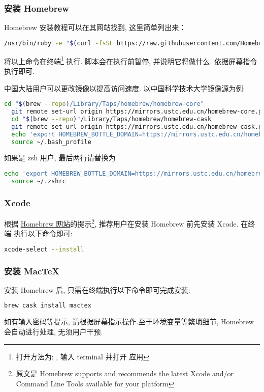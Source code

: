 \subsubsection{安装 Homebrew}
Homebrew 安装教程可以在其网站找到, 这里简单列出来：

\begin{lstlisting}[language=bash]
  /usr/bin/ruby -e "$(curl -fsSL https://raw.githubusercontent.com/Homebrew/install/master/install)"
\end{lstlisting}
将以上命令在\textsf{终端}\footnote{%
  打开方法为: \keys{\cmdmac + \SPACE}, 输入 \textsf{terminal} 并打开  应用}%
执行.
脚本会在执行前暂停, 并说明它将做什么. 依据屏幕指令执行即可.

中国大陆用户可以更改镜像以提高访问速度. 以中国科学技术大学镜像源为例:
\begin{lstlisting}[language=bash]
  cd "$(brew --repo)/Library/Taps/homebrew/homebrew-core"
  git remote set-url origin https://mirrors.ustc.edu.cn/homebrew-core.git
  cd "$(brew --repo)"/Library/Taps/homebrew/homebrew-cask
  git remote set-url origin https://mirrors.ustc.edu.cn/homebrew-cask.git
  echo 'export HOMEBREW_BOTTLE_DOMAIN=https://mirrors.ustc.edu.cn/homebrew-bottles' >> ~/.bash_profile
  source ~/.bash_profile
\end{lstlisting}
如果是 zsh 用户, 最后两行请替换为
\begin{lstlisting}[language=bash]
  echo 'export HOMEBREW_BOTTLE_DOMAIN=https://mirrors.ustc.edu.cn/homebrew-bottles' >> ~/.zshrc
  source ~/.zshrc
\end{lstlisting}

\subsubsection{Xcode}

根据 \href{https://docs.brew.sh/Xcode\#supported-xcode-versions}{Homebrew 网站}的提示\footnote{原文是 Homebrew supports and recommends the latest Xcode and/or Command Line Tools available for your platform},
推荐用户在安装 Homebrew 前先安装 Xcode.
在\textsf{终端} 执行以下命令即可:
\begin{lstlisting}[language=bash]
  xcode-select --install
\end{lstlisting}

\subsubsection{安装 Mac\TeX}

安装 Homebrew 后,
只需在\textsf{终端}执行以下命令即可完成安装:
\begin{lstlisting}[language=bash]
  brew cask install mactex
\end{lstlisting}
如有输入密码等提示, 请根据屏幕指示操作.至于环境变量等繁琐细节, Homebrew 会自动进行处理,
无须用户干预.

